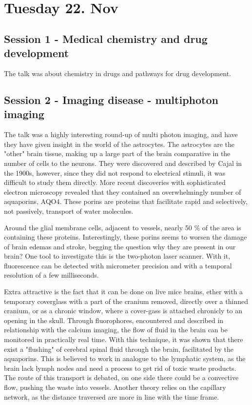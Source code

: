 \documentclass[12p]{article}
\begin{document}
\section*{Tuesday 22. Nov}

\subsection*{Session 1 - Medical chemistry and drug development}

The talk was about chemistry in drugs and pathways for drug development.


\subsection*{Session 2 - Imaging disease - multiphoton imaging}

The talk was a highly interesting round-up of multi photon imaging, and have they have given insight in the world of the astrocytes.
The astrocytes are the "other" brain tissue, making up a large part of the brain comparative in the number of cells to the neurons.
They were discovered and described by Cajal in the 1900s, however, since they did not respond to electrical stimuli, it was difficult to study them directly.
More recent discoveries with sophisticated electron microscopy revealed that they contained an overwhelmingly number of aquaporins, AQO4.
These porins are proteins that facilitate rapid and selectively, not passively, transport of water molecules.

Around the glial membrane cells, adjacent to vessels, nearly 50 \% of the area is containing these proteins.
Interestingly, these porins seems to worsen the damage of brain edemas and stroke, begging the question why they are present in our brain?
One tool to investigate this is the two-photon laser scanner.
With it, fluorescence can be detected with micrometer precision and with a temporal resolution of a few milliseconds.

Extra attractive is the fact that it can be done on live mice brains, ether with a temporary coverglass with a part of the cranium removed, directly over a thinned cranium, or as a chronic window, where a cover-gass is attached chronicly to an opening in the skull.
Through fluorophores, encountered and described in relationship with the calcium imaging, the flow of fluid in the brain can be monitored in practically real time.
With this technique, it was shown that there exist a "flushing" of cerebral spinal fluid through the brain, facilitated by the aquaporins.
This is believed to work in analogue to the lymphatic system, as the brain lack lymph nodes and need a process to get rid of toxic waste products.
The route of this transport is debated, on one side there could be a convective flow, pushing the waste into vessels.
Another theory relies on the capillary network, as the distance traversed are more in line with the time frame.
\end{document}
